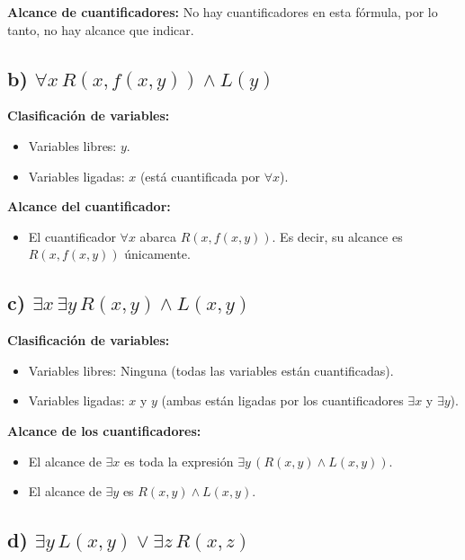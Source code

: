 \documentclass[11pt,letterpaper]{article}
\begin{document}
\textbf{Alcance de cuantificadores:} No hay cuantificadores en esta fórmula, por lo tanto, no hay alcance que indicar.

\subsection*{b) \( \forall x \, R(x, f(x, y)) \land L(y) \)}

\textbf{Clasificación de variables:}
\begin{itemize}
    \item Variables libres: \( y \).
    \item Variables ligadas: \( x \) (está cuantificada por \( \forall x \)).
\end{itemize}

\textbf{Alcance del cuantificador:}
\begin{itemize}
    \item El cuantificador \( \forall x \) abarca \( R(x, f(x, y)) \). Es decir, su alcance es \( R(x, f(x, y)) \) únicamente.
\end{itemize}

\subsection*{c) \( \exists x \, \exists y \, R(x, y) \land L(x, y) \)}

\textbf{Clasificación de variables:}
\begin{itemize}
    \item Variables libres: Ninguna (todas las variables están cuantificadas).
    \item Variables ligadas: \( x \) y \( y \) (ambas están ligadas por los cuantificadores \( \exists x \) y \( \exists y \)).
\end{itemize}

\textbf{Alcance de los cuantificadores:}
\begin{itemize}
    \item El alcance de \( \exists x \) es toda la expresión \( \exists y \, (R(x, y) \land L(x, y)) \).
    \item El alcance de \( \exists y \) es \( R(x, y) \land L(x, y) \).
\end{itemize}

\subsection*{d) \( \exists y \, L(x, y) \lor \exists z \, R(x, z) \)}
\end{document}
